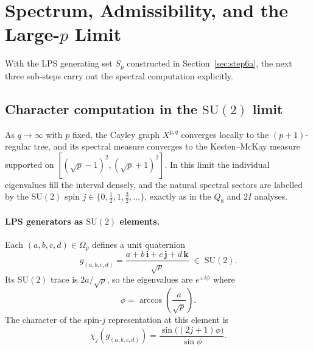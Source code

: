 \section{Spectrum, Admissibility, and the Large-$p$ Limit}
  \label{sec:step6bcd}

  With the LPS generating set $S_p$ constructed in Section~\ref{sec:step6a},
  the next three sub-steps carry out the spectral computation explicitly.

  \subsection{Character computation in the $\mathrm{SU}(2)$ limit}
    \label{sec:step6b}

    As $q \to \infty$ with $p$ fixed, the Cayley graph $X^{p,q}$ converges
    locally to the $(p+1)$-regular tree, and its spectral measure converges
    to the Kesten--McKay measure supported on $[(\sqrt{p}-1)^2,(\sqrt{p}+1)^2]$.
    In this limit the individual eigenvalues fill the interval densely, and
    the natural spectral sectors are labelled by the $\mathrm{SU}(2)$ spin
    $j \in \{0, \tfrac{1}{2}, 1, \tfrac{3}{2}, \ldots\}$, exactly as in the
    $Q_8$ and $2I$ analyses.

    \paragraph{LPS generators as $\mathrm{SU}(2)$ elements.}
      Each $(a,b,c,d) \in \Omega_p$ defines a unit quaternion
    \begin{equation}
      g_{(a,b,c,d)} = \frac{a + b\,\mathbf{i} + c\,\mathbf{j} + d\,\mathbf{k}}{\sqrt{p}}
      \;\in\; \mathrm{SU}(2).
      \label{eq:lps-su2-element}
      \end{equation}
      Its $\mathrm{SU}(2)$ trace is $2a/\sqrt{p}$, so the eigenvalues are
      $e^{\pm i\phi}$ where
    \begin{equation}
      \phi = \arccos\!\left(\frac{a}{\sqrt{p}}\right).
      \label{eq:lps-angle}
      \end{equation}
      The character of the spin-$j$ representation at this element is
    \begin{equation}
      \chi_j\!\left(g_{(a,b,c,d)}\right)
      = \frac{\sin\!\bigl((2j+1)\phi\bigr)}{\sin\phi}.
      \label{eq:lps-chi}
      \end{equation}

